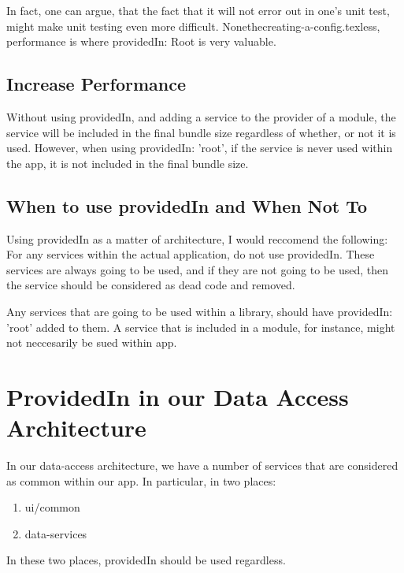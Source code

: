 In fact, one can argue, that the fact that it will not error out in one's unit
test, might make unit testing even more difficult. Nonethecreating-a-config.texless, performance is
where providedIn: Root is very valuable.

\subsection{ Increase Performance }
Without using providedIn, and adding a service to the provider of a module, the
service will be included in the final bundle size regardless of whether, or not
it is used. However, when using providedIn: 'root', if the service is never
used within the app, it is not included in the final bundle size.

\subsection{ When to use providedIn and When Not To }
Using providedIn as a matter of architecture, I would reccomend the following:
For any services within the actual application, do not use providedIn. These
services are always going to be used, and if they are not going to be used,
then the service should be considered as dead code and removed.

Any services that are going to be used within a library, should have
providedIn: 'root' added to them. A service that is included in a module, for
instance, might not neccesarily be sued within app.

\section{ProvidedIn in our Data Access Architecture}
In our data-access architecture, we have a number of services that are
considered as common within our app. In particular, in two places:
\begin{enumerate}
  \item ui/common
  \item data-services
\end{enumerate}

In these two places, providedIn should be used regardless.
